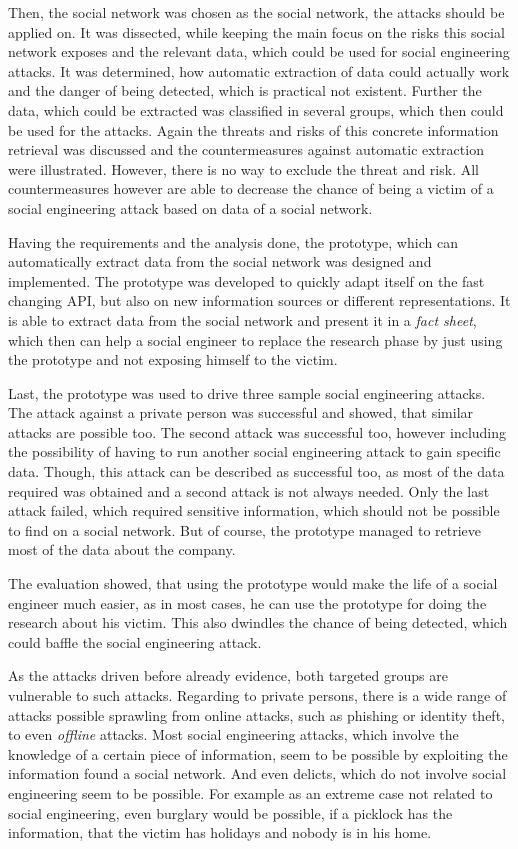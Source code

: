 Then, the \Twitter{} social network was chosen as the social network, the
attacks should be applied on. It was dissected, while keeping the main focus on the
risks this social network exposes and the relevant data, which could be used
for social engineering attacks. It was determined, how automatic extraction of
data could actually work and the danger of being detected, which is practical
not existent. Further the data, which could be extracted was classified in
several groups, which then could be used for the attacks. Again the threats and
risks of this concrete information retrieval was discussed and the
countermeasures against automatic extraction were illustrated. However, there
is no way to exclude the threat and risk. All countermeasures however are able
to decrease the chance of being a victim of a social engineering attack based
on data of a social network.

Having the requirements and the analysis done, the prototype, which can
automatically extract data from the \Twitter{} social network was designed and
implemented. The prototype was developed to quickly adapt itself on the fast
changing \Twitter{} API, but also on new information sources or different
representations. It is able to extract data from the social network and present
it in a \textit{fact sheet}, which then can help a social engineer to replace
the research phase by just using the prototype and not exposing himself to the
victim.

Last, the prototype was used to drive three sample social engineering attacks.
The attack against a private person was successful and showed, that similar
attacks are possible too. The second attack was successful too, however
including the possibility of having to run another social engineering attack to
gain specific data. Though, this attack can be described as successful too, as
most of the data required was obtained and a second attack is not always
needed. Only the last attack failed, which required sensitive information,
which should not be possible to find on a social network. But of course, the
prototype managed to retrieve most of the data about the company.

The evaluation showed, that using the prototype would make the life of a social
engineer much easier, as in most cases, he can use the prototype for doing the
research about his victim. This also dwindles the chance of being detected,
which could baffle the social engineering attack.

As the attacks driven before already evidence, both targeted groups are
vulnerable to such attacks. Regarding to private persons, there is a wide range
of attacks possible sprawling from online attacks, such as phishing or identity
theft, to even \textit{offline} attacks. Most social engineering attacks, which
involve the knowledge of a certain piece of information, seem to be possible by
exploiting the information found a social network. And even delicts, which do
not involve social engineering seem to be possible. For example as an extreme
case not related to social engineering, even burglary would be possible, if a
picklock has the information, that the victim has holidays and nobody is in his
home.

